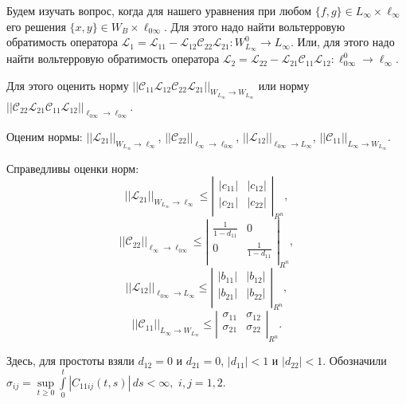 Будем изучать вопрос, когда для нашего уравнения при любом $\{ f,g\} \in L_{\infty}\times \ell_{\infty}$ его решения $\{ x,y\} \in W_{B}\times \ell_{0\infty}$. Для этого надо найти вольтерровую обратимость оператора ${\mathcal L}_1= {\mathcal L}_{11} - {\mathcal L}_{12} {\mathcal C}_{22} {\mathcal L}_{21}: W_{L_{\infty}}^{0} \to L_{\infty}$.  Или, для этого надо найти вольтерровую обратимость оператора ${\mathcal L}_2= {\mathcal L}_{22} - {\mathcal L}_{21} {\mathcal C}_{11} {\mathcal L}_{12}: \ell_{0\infty}^0 \to \ell_{\infty}$.

Для этого оценить норму $||{\mathcal C}_{11}{\mathcal L}_{12} {\mathcal C}_{22} {\mathcal L}_{21}||_{W_{L_{\infty}}\to W_{L_{\infty}}}$ или норму $||{\mathcal C}_{22}{\mathcal L}_{21} {\mathcal C}_{11} {\mathcal L}_{12}||_{{\ell_{0\infty}}\to {\ell_{0\infty}}}$.

Оценим нормы: $||{\mathcal L}_{21}||_{W_{L_{\infty}}\to \ell_{\infty}}$, $||{\mathcal C}_{22}||_{\ell_{\infty}\to \ell_{0\infty}}$, $||{\mathcal L}_{12}||_{\ell_{0\infty}\to L_{\infty}}$, $||{\mathcal C}_{11}||_{L_{\infty}\to W_{L_{\infty}}}$.

Справедливы оценки норм:
$$
||{\mathcal L}_{21}||_{W_{L_{\infty}}\to \ell_{\infty}} \leq
\left|\begin{array}{cc}
|c_{11}| & |c_{12}| \\
|c_{21}| & |c_{22}| \\
\end{array}\right|_{R^n},
$$
$$
||{\mathcal C}_{22}||_{\ell_{\infty}\to \ell_{0\infty}} \leq
\left|\begin{array}{cc}
\frac{1}{1-d_{11}} & 0 \\
0        & \frac{1}{1-d_{11}} \\
\end{array}\right|_{R^n},
$$
$$
||{\mathcal L}_{12}||_{\ell_{0\infty}\to L_{\infty}} \leq
\left|\begin{array}{cc}
|b_{11}| & |b_{12}| \\
|b_{21}| & |b_{22}| \\
\end{array}\right|_{R^n},
$$
$$
||{\mathcal C}_{11}||_{L_{\infty}\to W_{L_{\infty}}} \leq
\left|\begin{array}{cc}
\sigma_{11} & \sigma_{12} \\
\sigma_{21} & \sigma_{22} \\
\end{array}\right|_{R^n}.$$

Здесь, для простоты взяли $d_{12}=0$ и $d_{21}=0$, $|d_{11}| < 1$ и  $|d_{22}| < 1$.
Обозначили $\sigma_{ij}= \sup\limits_{t \geq 0}\int\limits_{0}^{t}|C_{11ij}(t,s)|\,ds < \infty, $ $i,j=1,2$.	
	
